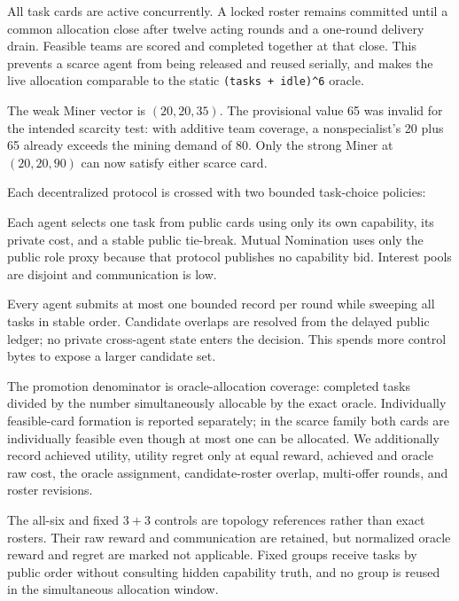 \documentclass[11pt]{article}
\newcommand{\code}[1]{\texttt{#1}}
\begin{document}
All task cards are active concurrently.  A locked roster remains committed
until a common allocation close after twelve acting rounds and a one-round
delivery drain.  Feasible teams are scored and completed together at that
close.  This prevents a scarce agent from being released and reused serially,
and makes the live allocation comparable to the static
\code{(tasks + idle)\textasciicircum6} oracle.

The weak Miner vector is $(20,20,35)$.  The provisional value 65 was invalid
for the intended scarcity test: with additive team coverage, a nonspecialist's
20 plus 65 already exceeds the mining demand of 80.  Only the strong Miner at
$(20,20,90)$ can now satisfy either scarce card.

Each decentralized protocol is crossed with two bounded task-choice policies:

\begin{description}[style=nextline,leftmargin=1.5em]
  \item[\code{local\_commit}.]
  Each agent selects one task from public cards using only its own capability,
  its private cost, and a stable public tie-break.  Mutual Nomination uses only
  the public role proxy because that protocol publishes no capability bid.
  Interest pools are disjoint and communication is low.
  \item[\code{public\_sweep}.]
  Every agent submits at most one bounded record per round while sweeping all
  tasks in stable order.  Candidate overlaps are resolved from the delayed
  public ledger; no private cross-agent state enters the decision.  This spends
  more control bytes to expose a larger candidate set.
\end{description}

The promotion denominator is oracle-allocation coverage: completed tasks
divided by the number simultaneously allocable by the exact oracle.
Individually feasible-card formation is reported separately; in the scarce
family both cards are individually feasible even though at most one can be
allocated.  We additionally record achieved utility, utility regret only at
equal reward, achieved and oracle raw cost, the oracle assignment,
candidate-roster overlap, multi-offer rounds, and roster revisions.

The all-six and fixed $3+3$ controls are topology references rather than exact
rosters.  Their raw reward and communication are retained, but normalized
oracle reward and regret are marked not applicable.  Fixed groups receive
tasks by public order without consulting hidden capability truth, and no group
is reused in the simultaneous allocation window.
\end{document}
